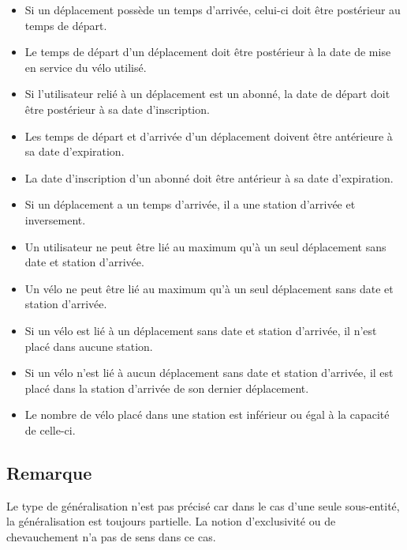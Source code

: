 \documentclass[a4paper, 12pt]{report}
\begin{document}
	\begin{itemize}
		\item Si un déplacement possède un temps d’arrivée, celui-ci doit être postérieur au temps de 			départ.
		
		\item Le temps de départ d’un déplacement doit être postérieur à la date de mise en service 			du vélo utilisé.
		
		\item Si l’utilisateur relié à un déplacement est un abonné, la date de départ doit être 				postérieur à sa date d’inscription.
		
		\item Les temps de départ et d’arrivée d’un déplacement doivent être antérieure à sa date 			d’expiration.
		
		\item La date d’inscription d’un abonné doit être antérieur à sa date d’expiration.
		
		\item Si un déplacement a un temps d’arrivée, il a une station d’arrivée et inversement.
		
		\item Un utilisateur ne peut être lié au maximum qu’à un seul déplacement sans date et 				station d’arrivée.
		
		\item Un vélo ne peut être lié au maximum qu’à un seul déplacement sans date et station 				d’arrivée.
		
		\item Si un vélo est lié à un déplacement sans date et station d’arrivée, il n’est placé dans 			aucune station.
		
		\item Si un vélo n’est lié à aucun déplacement sans date et station d’arrivée, il est placé dans 			la station d’arrivée de son dernier déplacement.
		
		\item Le nombre de vélo placé dans une station est inférieur ou égal à la capacité de celle-ci.
		
	\end{itemize}
	
	\subsection*{Remarque}
		Le type de généralisation n’est pas précisé car dans le cas d’une seule sous-entité, la 			généralisation est toujours partielle. La notion d’exclusivité ou de chevauchement n’a pas de 		sens dans ce cas.
\end{document}
